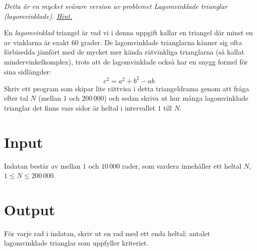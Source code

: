 \emph{Detta är en mycket svårare version av problemet Lagomvinklade trianglar (lagomvinklade). \href{https://en.wikipedia.org/wiki/Eisenstein_integer}{Hint.}}

En \emph{lagomvinklad} triangel är vad vi i denna uppgift kallar en triangel där minst en av vinklarna är exakt 60 grader. De lagomvinklade trianglarna känner sig ofta förbisedda jämfört med de mycket mer kända rätvinkliga trianglarna (så kallat mindervinkelkomplex), trots att de lagomvinklade också har en snygg formel för sina sidlängder:
\begin{equation*}
	c^2 = a^2 + b^2 - ab
\end{equation*}
Skriv ett program som skipar lite rättvisa i detta triangeldrama genom att fråga efter tal $N$ (mellan $1$ och $200\,000$) och sedan skriva ut hur många lagomvinklade trianglar det finns vars sidor är heltal i intervallet $1$ till $N$.

\section*{Input}
Indatan består av mellan $1$ och $10\,000$ rader, som vardera innehåller ett heltal $N$, $1 \leq N \leq 200\,000$.

\section*{Output}
För varje rad i indatan, skriv ut en rad med ett enda heltal; antalet lagomvinklade trianglar som uppfyller kriteriet.
